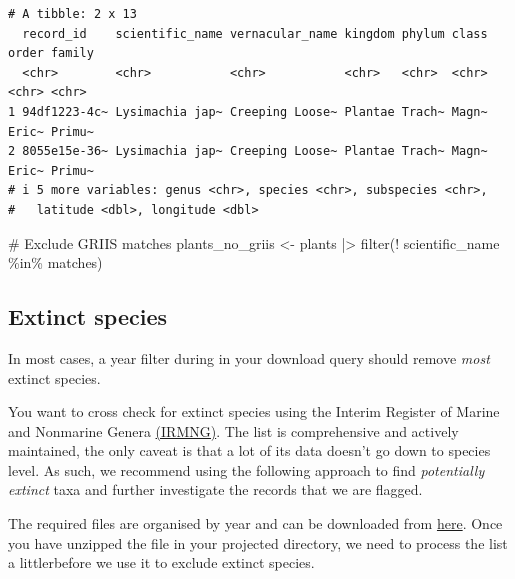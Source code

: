 \documentclass[
  letterpaper,
  DIV=11,
  numbers=noendperiod,
  oneside]{scrreprt}
\newenvironment{Shaded}{\begin{snugshade}}{\end{snugshade}}
\newcommand{\CommentTok}[1]{\textcolor[rgb]{0.37,0.37,0.37}{#1}}
\newcommand{\FunctionTok}[1]{\textcolor[rgb]{0.28,0.35,0.67}{#1}}
\newcommand{\NormalTok}[1]{\textcolor[rgb]{0.00,0.23,0.31}{#1}}
\newcommand{\OtherTok}[1]{\textcolor[rgb]{0.00,0.23,0.31}{#1}}
\newcommand{\SpecialCharTok}[1]{\textcolor[rgb]{0.37,0.37,0.37}{#1}}
\begin{document}
\begin{verbatim}
# A tibble: 2 x 13
  record_id    scientific_name vernacular_name kingdom phylum class order family
  <chr>        <chr>           <chr>           <chr>   <chr>  <chr> <chr> <chr> 
1 94df1223-4c~ Lysimachia jap~ Creeping Loose~ Plantae Trach~ Magn~ Eric~ Primu~
2 8055e15e-36~ Lysimachia jap~ Creeping Loose~ Plantae Trach~ Magn~ Eric~ Primu~
# i 5 more variables: genus <chr>, species <chr>, subspecies <chr>,
#   latitude <dbl>, longitude <dbl>
\end{verbatim}

\begin{Shaded}
\begin{Highlighting}[]
\CommentTok{\# Exclude GRIIS matches}
\NormalTok{plants\_no\_griis }\OtherTok{\textless{}{-}}\NormalTok{ plants }\SpecialCharTok{|\textgreater{}} \FunctionTok{filter}\NormalTok{(}\SpecialCharTok{!}\NormalTok{ scientific\_name }\SpecialCharTok{\%in\%}\NormalTok{ matches)}
\end{Highlighting}
\end{Shaded}

\hypertarget{extinct-species}{%
\subsection{Extinct species}\label{extinct-species}}

In most cases, a year filter during in your download query should remove
\emph{most} extinct species.

You want to cross check for extinct species using the Interim Register
of Marine and Nonmarine Genera \href{https://www.irmng.org/}{(IRMNG)}.
The list is comprehensive and actively maintained, the only caveat is
that a lot of its data doesn't go down to species level. As such, we
recommend using the following approach to find \emph{potentially
extinct} taxa and further investigate the records that we are flagged.

The required files are organised by year and can be downloaded from
\href{https://www.irmng.org/export/}{here}. Once you have unzipped the
file in your projected directory, we need to process the list a
littlerbefore we use it to exclude extinct species.
\end{document}
